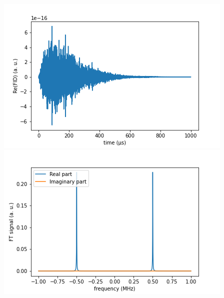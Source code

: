 \documentclass[10pt]{beamer}
\begin{document}
\begin{frame}
$$\begin{columns}[T]
\begin{column}{.5\textwidth}
\begin{column}{.5\textwidth}
\end{column}
\end{column}
\begin{column}{.5\textwidth}
\includegraphics[width=\textwidth]{./spin1-2/24uncorrelated_pure_hyperfineAnisotrop/FIDSignal.png}
\includegraphics[width=\textwidth]{./spin1-2/24uncorrelated_pure_hyperfineAnisotrop/FTSignal.png}
\end{column}
\end{columns}
\end{frame}
\end{document}
